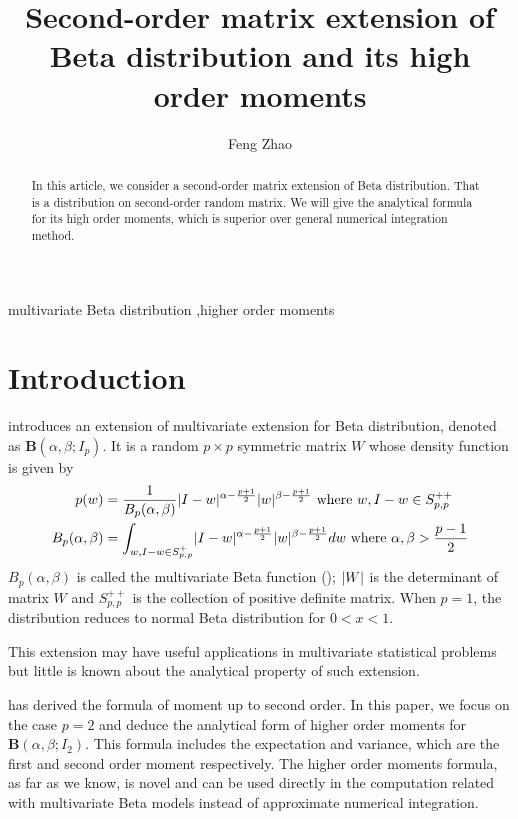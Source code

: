 \documentclass[review,authoryear]{elsarticle}
\DeclarePairedDelimiter\abs{\lvert}{\rvert}
\begin{document}
\begin{frontmatter}
\title{Second-order matrix extension of Beta distribution and its high order moments}
\author[1]{Feng Zhao}
\address[1]{Department of Electronic Engineering, Tsinghua University, Beijing China}

 \begin{abstract}
In this article, we consider a second-order matrix extension of Beta distribution.
That is a distribution on second-order random matrix.
We will give the analytical
formula for its high order moments, which is superior over general
numerical integration method.
 \end{abstract}
\begin{keyword}
 multivariate Beta distribution \sep higher order moments
\end{keyword}
\end{frontmatter}
\section{Introduction}
\citet{david1981} introduces an extension of
multivariate extension for Beta distribution,
denoted as $\mathbf{B}(\alpha, \beta; I_p)$.
It is a random $p\times p$  symmetric matrix $W$ whose density
function is given by
\begin{align}
p(w) &= \frac{1}{B_p(\alpha, \beta)}\abs{I-w}^{\alpha-\frac{p+1}{2}}
\abs{w}^{\beta-\frac{p+1}{2}} \textrm{ where } w, I-w \in S_{p,p}^{++}
\label{eq:distr}\\
B_p(\alpha, \beta) &= \int_{w,I-w \in S_{p,p}^{+} }\abs{I-w}^{\alpha-\frac{p+1}{2}}
\abs{w}^{\beta-\frac{p+1}{2}}dw \textrm{ where } \alpha, \beta > \frac{p-1}{2}
\end{align}
$B_p(\alpha, \beta)$ is called the multivariate Beta function (\citet{siegel_1935}); 
$\abs{W}$ is the determinant of matrix $W$ and $S_{p,p}^{++}$ is the 
collection of positive
definite matrix.
When $p=1$, the distribution reduces to normal Beta distribution for
$0<x<1$.

This extension may have useful applications in multivariate statistical
problems but little is known about the analytical property of such extension.

\cite{konno_1988}
has derived the formula of moment up to second order.
In this paper, we focus on the case $p=2$ and deduce the analytical form of 
higher order moments for $\mathbf{B}(\alpha, \beta; I_2)$.
This formula
includes the expectation and variance, which are the first and second
order moment respectively. The higher order moments formula, as
far as we know, is novel and can be used directly in the computation
related with multivariate Beta models instead of approximate
numerical integration.
\end{document}
